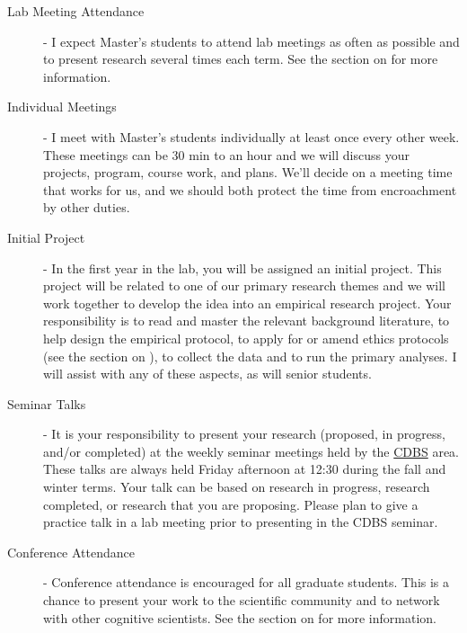 \documentclass{article}
\begin{document}
\begin{description}
\item [Lab Meeting Attendance] - I expect Master's students to attend lab meetings as often as possible and to present research several times each term. See the section on  for more information.

\item [Individual Meetings] - I meet with Master's students individually at least once every other week. These meetings can be 30 min to an hour and we will discuss your projects, program, course work, and plans. We'll decide on a meeting time that works for us, and we should both protect the time from encroachment by other duties. 

\item [Initial Project] - In the first year in the lab, you will be assigned an initial project. This project will be related to one of our primary research themes and we will work together to develop the idea into an empirical research project. Your responsibility is to read and master the relevant background literature, to help design the empirical protocol, to apply for or amend ethics protocols (see the section on ), to collect the data and to run the primary analyses. I will assist with any of these aspects, as will senior students. 

\item [Seminar Talks] - It is your responsibility to present your research (proposed, in progress, and/or completed) at the weekly seminar meetings held by the \href{http://psychology.uwo.ca/graduate/program_information/cdbs_program_requirements.html} {CDBS} area. These talks are always held Friday afternoon at 12:30 during the fall and winter terms. Your talk can be based on research in progress, research completed, or research that you are proposing. Please plan to give a practice talk in a lab meeting prior to presenting in the CDBS seminar. 

\item [Conference Attendance] - Conference attendance is encouraged for all graduate students. This is a chance to present your work to the scientific community and to network with other cognitive scientists. See the section on  for more information.


\end{description}
\end{document}
